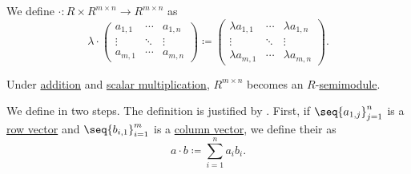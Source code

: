\begin{proposition}
\begin{thmenum}
     We define  \( \cdot: R \times R^{m \times n} \to R^{m \times n} \) as
    \begin{equation*}
       \lambda \cdot \begin{pmatrix}
        a_{1,1} & \cdots & a_{1,n} \\
        \vdots  & \ddots & \vdots  \\
        a_{m,1} & \cdots & a_{m,n}
      \end{pmatrix}
      \coloneqq
      \begin{pmatrix}
        \lambda a_{1,1} & \cdots & \lambda a_{1,n} \\
        \vdots          & \ddots & \vdots          \\
        \lambda a_{m,1} & \cdots & \lambda a_{m,n}
      \end{pmatrix}.
    \end{equation*}

    Under \hyperref[thm:matrix_algebra/addition]{addition} and \hyperref[thm:matrix_algebra/scalar_multiplication]{scalar multiplication}, \( R^{m \times n} \) becomes an \( R \)-\hyperref[def:semimodule]{semimodule}.

     We define  in two steps. The definition is justified by . First, if \( \seq{ a_{1,j} }_{j=1}^n \) is a \hyperref[def:array/row_vector]{row vector} and \( \seq{ b_{i,1} }_{i=1}^m \) is a \hyperref[def:array/column_vector]{column vector}, we define their  as
    \begin{equation*}
      a \cdot b \coloneqq \sum_{i=1}^n a_i b_i.
    \end{equation*}


\end{thmenum}
\end{proposition}
